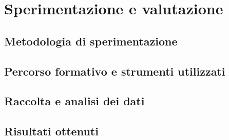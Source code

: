 \chapter{Sperimentazione e valutazione}\label{chap:experiments}
\section{Metodologia di sperimentazione}

\section{Percorso formativo e strumenti utilizzati}
\section{Raccolta e analisi dei dati}
\section{Risultati ottenuti}